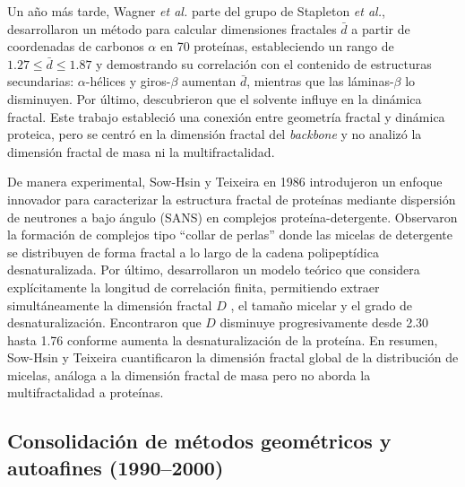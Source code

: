 Un año m\'{a}s tarde, Wagner \textit{et al.} \cite{Wagner1985} parte  del grupo de Stapleton \textit{et al.}, desarrollaron un m\'{e}todo para calcular dimensiones fractales $\bar{d}$ a partir de coordenadas de carbonos $\alpha$ en 70 prote\'{i}nas, estableciendo un rango de $1.27 \leq \bar{d} \leq 1.87$ y demostrando su correlaci\'{o}n con el contenido de estructuras secundarias: $\alpha$-h\'{e}lices y giros-$\beta$ aumentan $\bar{d}$, mientras que las l\'{a}minas-$\beta$ lo disminuyen. Por \'{u}ltimo, descubrieron que el solvente influye en la din\'{a}mica fractal. Este trabajo estableció una conexión entre geometría fractal y dinámica proteica, pero se centró en la dimensión fractal del \textit{backbone} y no analizó la dimensión fractal de masa ni la multifractalidad.



De manera experimental, Sow-Hsin y Teixeira \cite{Chen1986} en 1986 introdujeron un enfoque innovador para caracterizar la estructura fractal de prote\'{i}nas mediante dispersi\'{o}n de neutrones a bajo \'{a}ngulo (SANS) en complejos prote\'{i}na-detergente. Observaron la formaci\'{o}n de complejos tipo ``collar de perlas'' donde las micelas de detergente se distribuyen de forma fractal a lo largo de la cadena polipept\'{i}dica desnaturalizada. Por \'{u}ltimo, desarrollaron un modelo te\'{o}rico que considera expl\'{i}citamente la longitud de correlaci\'{o}n finita, permitiendo extraer simult\'{a}neamente la dimensi\'{o}n fractal $D$ , el tamaño micelar y el grado de desnaturalizaci\'{o}n. Encontraron que $D$ disminuye progresivamente desde 2.30 hasta 1.76 conforme aumenta la desnaturalizaci\'{o}n de la prote\'{i}na. En resumen, Sow-Hsin y Teixeira cuantificaron la dimensión fractal global de la distribución de micelas, análoga a la dimensión fractal de masa pero no aborda la multifractalidad a proteínas.


\subsection{Consolidaci\'{o}n de m\'{e}todos geom\'{e}tricos y autoafines (1990--2000)}


